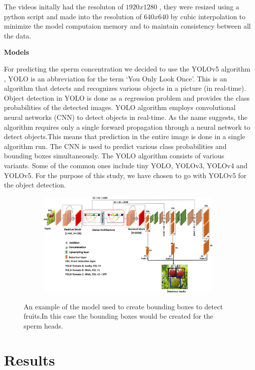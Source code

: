 \documentclass{article}
\begin{document}
The videos initally had the resoluton of $1920x1280$ , they were resized using a python script and made into the resolution of $640x640$ by cubic 
interpolation to minimize the model computaion memory and to maintain consistency between all the data.

\textbf{Models} 

For predicting the sperm concentration we decided to use the YOLOv5\citep{glenn_jocher_2021_5563715} algorithm , 
YOLO is an abbreviation for the term ‘You Only Look Once’. 
This is an algorithm that detects and recognizes various objects in a picture (in real-time). 
Object detection in YOLO is done as a regression problem and provides the class probabilities of the detected images.
YOLO algorithm employs convolutional neural networks (CNN) to detect objects in real-time. 
As the name suggests, the algorithm requires only a single forward propagation through a 
neural network to detect objects.This means that prediction in the entire image is done in a single algorithm run. 
The CNN is used to predict various class probabilities and bounding boxes simultaneously.
The YOLO algorithm consists of various variants. Some of the common ones include tiny YOLO, YOLOv3, YOLOv4 and YOLOv5. For the purpose of this study, we have chosen to go with YOLOv5 for the object detection.
\begin{figure}[H]
  \centering
  \begin{subfigure}{10.5cm}
    \centering\includegraphics[width=10.5cm]{yolo.png}
  \end{subfigure}
  \caption{An example of the model used to create bounding boxes to detect fruits.In this case the bounding boxes would be created for the sperm heads.}
 \label{fig:yolo}
\end{figure}


\section{Results}
\end{document}
